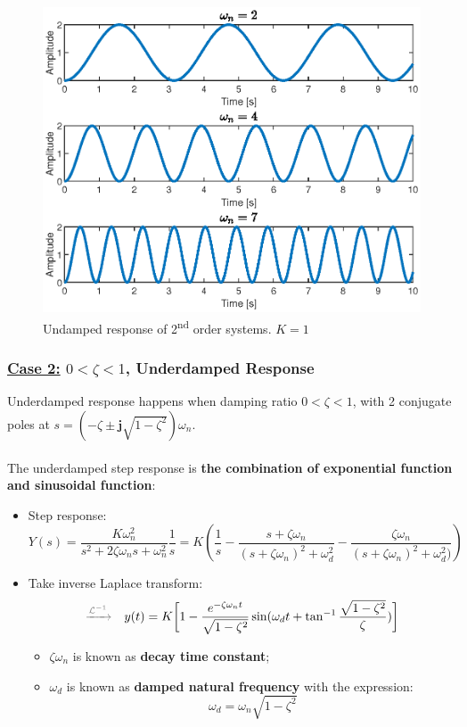 \begin{figure}[H] 
    \centering 
    \includegraphics[width=.8\textwidth]{images/undamped_response.eps}
    \caption{Undamped response of 2\textsuperscript{nd} order systems. $K=1$}
\end{figure}

\subsubsection{\underline{Case 2:} $0<\zeta<1$, Underdamped Response}
Underdamped response happens when damping ratio $0<\zeta<1$, with 2 conjugate poles at $s = (-\zeta\pm \mathbf{j} \sqrt{1-\zeta^{2}})\omega_{n}$.\\\\
The underdamped step response is \textbf{the combination of exponential function and sinusoidal function}:
\begin{itemize}
    \item Step response: 
    \[
    Y(s) = \frac{K\omega_{n}^{2}}{s^{2}	+2\zeta\omega_{n}s+\omega_{n}^{2}} \frac{1}{s} = K(\frac{1}{s}-\frac{s+\zeta\omega_{n}}{(s+\zeta\omega_{n})^{2}+\omega_{d}^{2}}-\frac{\zeta\omega_{n}}{(s+\zeta\omega_{n})^{2}+\omega_{d}^{2})})
    \]
    
    \item Take inverse Laplace transform:
    \[ {\color{gray}\xrightarrow{\mathcal{L}^{-1}}} \quad
    y(t) = K \bigg[ 1-\frac{e^{-\zeta\omega_{n} t}}{\sqrt{1-\zeta^{2}}} \sin(\omega_{d}t +\tan^{-1}\frac{\sqrt{1-\zeta^{2}}}{\zeta}) \bigg] 
    \]
    \begin{itemize}
        \item $\zeta\omega_{n}$ is known as \textbf{decay time constant};
        
        \item $\omega_{d}$ is known as \textbf{damped natural frequency} with the expression:
        \[\omega_{d} = \omega_{n}\sqrt{1-\zeta^{2}}\]
    \end{itemize}
\end{itemize}

